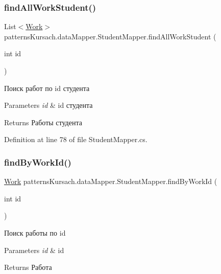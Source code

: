 \subsubsection{\texorpdfstring{find\+All\+Work\+Student()}{findAllWorkStudent()}}
{\footnotesize\ttfamily List$<$\mbox{\hyperlink{classpatterns_kursach_1_1_work}{Work}}$>$ patterns\+Kursach.\+data\+Mapper.\+Student\+Mapper.\+find\+All\+Work\+Student (\begin{DoxyParamCaption}\item[{int}]{id }\end{DoxyParamCaption})}



Поиск работ по id студента 


\begin{DoxyParams}{Parameters}
{\em id} & id студента\\
\hline
\end{DoxyParams}
\begin{DoxyReturn}{Returns}
Работы студента
\end{DoxyReturn}


Definition at line 78 of file Student\+Mapper.\+cs.

\mbox{\label{classpatterns_kursach_1_1data_mapper_1_1_student_mapper_ade29783b17cd615f565ccf2869eff1a4}} 
\subsubsection{\texorpdfstring{find\+By\+Work\+Id()}{findByWorkId()}}
{\footnotesize\ttfamily \mbox{\hyperlink{classpatterns_kursach_1_1_work}{Work}} patterns\+Kursach.\+data\+Mapper.\+Student\+Mapper.\+find\+By\+Work\+Id (\begin{DoxyParamCaption}\item[{int}]{id }\end{DoxyParamCaption})}



Поиск работы по id 


\begin{DoxyParams}{Parameters}
{\em id} & id\\
\hline
\end{DoxyParams}
\begin{DoxyReturn}{Returns}
Работа
\end{DoxyReturn}


